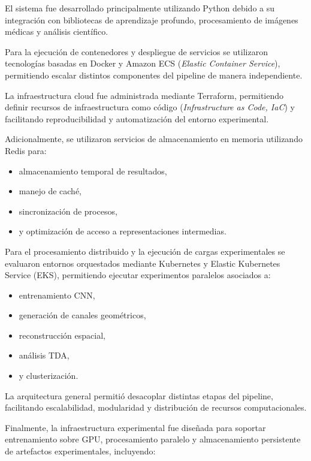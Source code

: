 \documentclass[conference]{IEEEtran}
\begin{document}
El sistema fue desarrollado principalmente utilizando Python debido a su integración con bibliotecas de aprendizaje profundo, procesamiento de imágenes médicas y análisis científico.

Para la ejecución de contenedores y despliegue de servicios se utilizaron tecnologías basadas en Docker y Amazon ECS (\textit{Elastic Container Service}), permitiendo escalar distintos componentes del pipeline de manera independiente.

La infraestructura cloud fue administrada mediante Terraform, permitiendo definir recursos de infraestructura como código (\textit{Infrastructure as Code, IaC}) y facilitando reproducibilidad y automatización del entorno experimental.

Adicionalmente, se utilizaron servicios de almacenamiento en memoria utilizando Redis para:

\begin{itemize}
    \item almacenamiento temporal de resultados,
    \item manejo de caché,
    \item sincronización de procesos,
    \item y optimización de acceso a representaciones intermedias.
\end{itemize}

Para el procesamiento distribuido y la ejecución de cargas experimentales se evaluaron entornos orquestados mediante Kubernetes y Elastic Kubernetes Service (EKS), permitiendo ejecutar experimentos paralelos asociados a:

\begin{itemize}
    \item entrenamiento CNN,
    \item generación de canales geométricos,
    \item reconstrucción espacial,
    \item análisis TDA,
    \item y clusterización.
\end{itemize}

La arquitectura general permitió desacoplar distintas etapas del pipeline, facilitando escalabilidad, modularidad y distribución de recursos computacionales.

Finalmente, la infraestructura experimental fue diseñada para soportar entrenamiento sobre GPU, procesamiento paralelo y almacenamiento persistente de artefactos experimentales, incluyendo:
\end{document}
